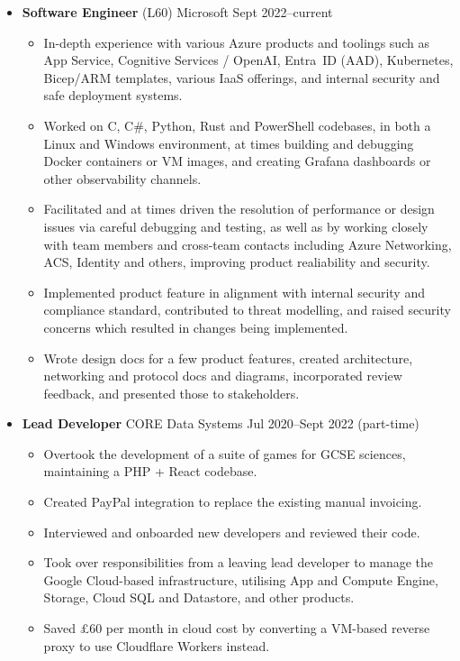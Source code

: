   \begin{itemize}
    \item \textbf{Software Engineer} (L60) \dashdiv{} Microsoft \dashdiv{} Sept 2022--current

    \begin{itemize}
      \item In-depth experience with various Azure products and toolings such as App Service, Cognitive Services / OpenAI, Entra~ID (AAD), Kubernetes, Bicep/ARM templates, various IaaS offerings, and internal security and safe deployment systems.
      \item Worked on C, C\#, Python, Rust and PowerShell codebases, in both a Linux and Windows environment, at times building and debugging Docker containers or VM images, and creating Grafana dashboards or other observability channels.
      \item Facilitated and at times driven the resolution of performance or design issues via careful debugging and testing, as well as by working closely with team members and cross-team contacts including Azure Networking, ACS, Identity and others, improving product realiability and security.
      \item Implemented product feature in alignment with internal security and compliance standard, contributed to threat modelling, and raised security concerns which resulted in changes being implemented.
      \item Wrote design docs for a few product features, created architecture, networking and protocol docs and diagrams, incorporated review feedback, and presented those to stakeholders.
    \end{itemize}

    \item \textbf{Lead Developer} \dashdiv{} CORE Data Systems \dashdiv{} Jul 2020--Sept 2022 (part-time)

    \begin{itemize}
      \item Overtook the development of a suite of games for GCSE sciences, maintaining a PHP + React codebase.
      \item Created PayPal integration to replace the existing manual invoicing.
      \item Interviewed and onboarded new developers and reviewed their code.
      \item Took over responsibilities from a leaving lead developer to manage the Google Cloud-based infrastructure, utilising App and Compute Engine, Storage, Cloud SQL and Datastore, and other products.
      \item Saved £60 per month in cloud cost by converting a VM-based reverse proxy to use Cloudflare Workers instead.
    \end{itemize}


\end{itemize}
